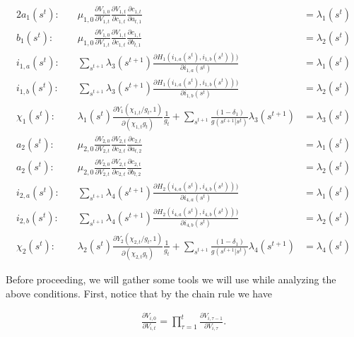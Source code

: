 \documentclass[19pt]{article}
\newcommand{\fracpd}[2]{
  \ensuremath{\frac{\partial #1}{\partial #2}}
}
\begin{document}
\begin{alignat}{2}
  a_{1}(s^t)   : \quad & \mu_{1,0} \fracpd{V_{1,0}}{V_{1,t}}\fracpd{V_{1,t}}{c_{1,t}} \fracpd{c_{1,t}}{a_{t,1}} &= \lambda_{1}(s^t) \label{eq:foc_a1} \\
  b_{1}(s^t)   : \quad & \mu_{1,0} \fracpd{V_{1,0}}{V_{1,t}}\fracpd{V_{1,t}}{c_{1,t}} \fracpd{c_{1,t}}{b_{t,1}} &= \lambda_{2}(s^t) \label{eq:foc_b1} \\
  i_{1,a}(s^t) : \quad & \sum_{s^{t+1}} \lambda_3(s^{t+1}) \fracpd{H_1(i_{1,a}(s^t),i_{1,b}(s^t)))}{i_{1,a}(s^t)} &= \lambda_1(s^t) \label{eq:foc_i1a} \\
  i_{1,b}(s^t) : \quad & \sum_{s^{t+1}} \lambda_3(s^{t+1}) \fracpd{H_1(i_{1,a}(s^t),i_{1,b}(s^t)))}{i_{1,b}(s^t)} &= \lambda_2(s^t)\label{eq:foc_i1b} \\
  \chi_{1}(s^t): \quad & \lambda_1(s^t) \fracpd{Y_1(\chi_{1,t}/g_t, 1)}{(\chi_{1,t} g_t)} \frac{1}{g_t} + \sum_{s^{t+1}} \frac{(1 - \delta_1)}{g(s^{t+1}|s^t)}\lambda_3(s^{t+1}) &= \lambda_3(s^t) \label{eq:foc_chi1} \\
  a_{2}(s^t)   : \quad & \mu_{2,0} \fracpd{V_{2,0}}{V_{2,t}}\fracpd{V_{2,t}}{c_{2,t}} \fracpd{c_{2,t}}{a_{t,2}} &= \lambda_{1}(s^t)\label{eq:foc_a2} \\
  a_{2}(s^t)   : \quad & \mu_{2,0} \fracpd{V_{2,0}}{V_{2,t}}\fracpd{V_{2,t}}{c_{2,t}} \fracpd{c_{2,t}}{b_{t,2}} &= \lambda_{2}(s^t)\label{eq:foc_b2} \\
  i_{2,a}(s^t) : \quad & \sum_{s^{t+1}} \lambda_4(s^{t+1}) \fracpd{H_2(i_{4,a}(s^t),i_{4,b}(s^t)))}{i_{4,a}(s^t)} &= \lambda_1(s^t) \label{eq:foc_i2a} \\
  i_{2,b}(s^t) : \quad & \sum_{s^{t+1}} \lambda_4(s^{t+1}) \fracpd{H_2(i_{4,a}(s^t),i_{4,b}(s^t)))}{i_{4,b}(s^t)} &= \lambda_2(s^t)\label{eq:foc_i2b} \\
  \chi_{2}(s^t): \quad & \lambda_2(s^t) \fracpd{Y_2(\chi_{2,t}/g_t, 1)}{(\chi_{2,t} g_t)} \frac{1}{g_t} + \sum_{s^{t+1}} \frac{(1 - \delta_1)}{g(s^{t+1}|s^t)}\lambda_4(s^{t+1}) &= \lambda_4(s^t) \label{eq:foc_chi2}
\end{alignat}

Before proceeding, we will gather some tools we will use while analyzing the above conditions. First, notice that by the chain rule we have

\begin{align} \label{eq:chain_derivs}
  \fracpd{V_{i,0}}{V_{i,t}} = \prod_{\tau=1}^{t} \fracpd{V_{i,\tau-1}}{V_{i,\tau}}.
\end{align}
\end{document}
